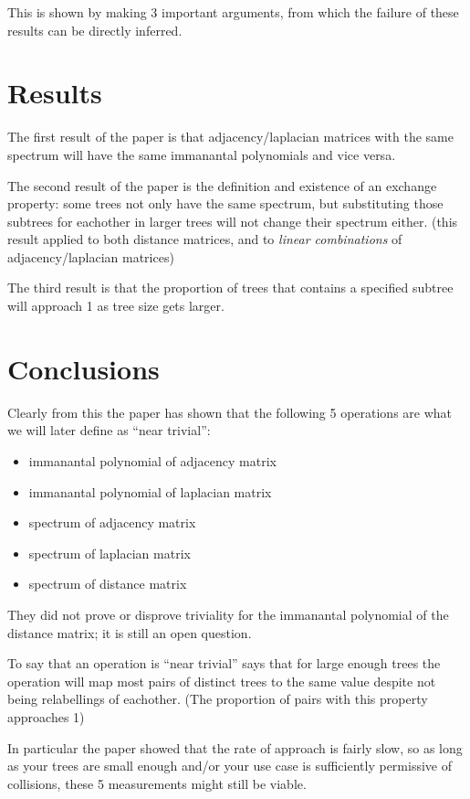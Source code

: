 \documentclass[10pt,a4paper]{report}
\begin{document}
This is shown by making 3 important arguments, from which the failure of these
results can be directly inferred.

\section{Results}

The first result of the paper is that adjacency/laplacian matrices with the
same spectrum will have the same immanantal polynomials and vice versa.

The second result of the paper is the definition and existence of an exchange
property: some trees not only have the same spectrum, but substituting those subtrees for eachother in larger trees will not change their spectrum either.
(this result applied to both distance matrices, and to \emph{linear combinations} of adjacency/laplacian matrices)

The third result is that the proportion of trees that contains a specified
subtree will approach 1 as tree size gets larger.

\section{Conclusions}

Clearly from this the paper has shown that the following 5 operations are what
we will later define as ``near trivial'':
\begin{itemize}
	\item immanantal polynomial of adjacency matrix
	\item immanantal polynomial of laplacian matrix
	\item spectrum of adjacency matrix
	\item spectrum of laplacian matrix
	\item spectrum of distance matrix
\end{itemize}

They did not prove or disprove triviality for the immanantal polynomial of the distance matrix; it is still an open question.

To say that an operation is ``near trivial'' says that for large enough
trees the operation will map most pairs of distinct trees to the same
value despite not being relabellings of eachother. (The proportion of pairs with this property approaches 1)

In particular the paper showed that the rate of approach is fairly slow, so as
long as your trees are small enough and/or your use case is sufficiently permissive
of collisions, these 5 measurements might still be viable.
\end{document}
